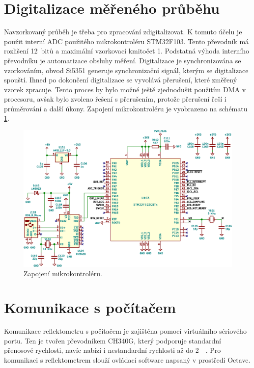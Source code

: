\section{Digitalizace měřeného průběhu}
Navzorkovaný průběh je třeba pro zpracování zdigitalizovat. K tomuto účelu je použit interní \acrshort{ADC} použitého mikrokontroléru STM32F103. Tento převodník má rozlišení 12~bitů a maximální vzorkovací kmitočet \SI{1}{\megasample}. Podstatná výhoda interního převodníku je automatizace obsluhy měření. Digitalizace je synchronizována se vzorkováním, obvod Si5351 generuje synchronizační signál, kterým se digitalizace spouští. Ihned po dokončení digitalizace se vyvolává přerušení, které změřený vzorek zpracuje. Tento proces by bylo možné ještě zjednodušit použitím DMA v procesoru, avšak bylo zvoleno řešení s přerušením, protože přerušení řeší i průměrování a další úkony. Zapojení mikrokontroléru je vyobrazeno na schématu \ref{microcontroller_section}.

\begin{figure}[htbp]
\includegraphics[width=\textwidth,keepaspectratio]{images/microcontroller_section.eps}\caption{Zapojení mikrokontroléru.}\label{microcontroller_section}
\end{figure}

\section{Komunikace s počítačem}
Komunikace reflektometru s počítačem je zajištěna pomocí virtuálního sériového portu. Ten je tvořen převodníkem CH340G, který podporuje standardní přenosové rychlosti, navíc nabízí i nestandardní rychlosti až do \SI{2}{\mega\baud}. Pro komunikaci s reflektometrem slouží ovládací software napsaný v prostředí Octave.